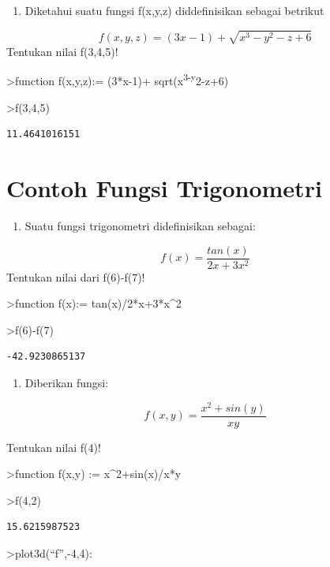 \documentclass[
]{book}
\providecommand{\tightlist}{%
  \setlength{\itemsep}{0pt}\setlength{\parskip}{0pt}}
\begin{document}
\begin{enumerate}
\def\labelenumi{\arabic{enumi}.}
\setcounter{enumi}{2}
\tightlist
\item
  Diketahui suatu fungsi f(x,y,z) diddefinisikan sebagai betrikut
\end{enumerate}

\[f(x,y,z)=(3x-1)+\sqrt{x^3-y^2-z+6}\]Tentukan nilai f(3,4,5)!

\textgreater function f(x,y,z):= (3*x-1)+ sqrt(x\textsuperscript{3-y}2-z+6)

\textgreater f(3,4,5)

\begin{verbatim}
11.4641016151
\end{verbatim}

\section{Contoh Fungsi Trigonometri}\label{contoh-fungsi-trigonometri}

\begin{enumerate}
\def\labelenumi{\arabic{enumi}.}
\tightlist
\item
  Suatu fungsi trigonometri didefinisikan sebagai:
\end{enumerate}

\[f(x)=\frac{tan(x)}{2x+3x^2}\]Tentukan nilai dari f(6)-f(7)!

\textgreater function f(x):= tan(x)/2*x+3*x\^{}2

\textgreater f(6)-f(7)

\begin{verbatim}
-42.9230865137
\end{verbatim}

\begin{enumerate}
\def\labelenumi{\arabic{enumi}.}
\setcounter{enumi}{1}
\tightlist
\item
  Diberikan fungsi:
\end{enumerate}

\[f(x,y)=\frac{x^2+sin(y)}{xy}\]

Tentukan nilai f(4)!

\textgreater function f(x,y) := x\^{}2+sin(x)/x*y

\textgreater f(4,2)

\begin{verbatim}
15.6215987523
\end{verbatim}

\textgreater plot3d(``f'',-4,4):
\end{document}
